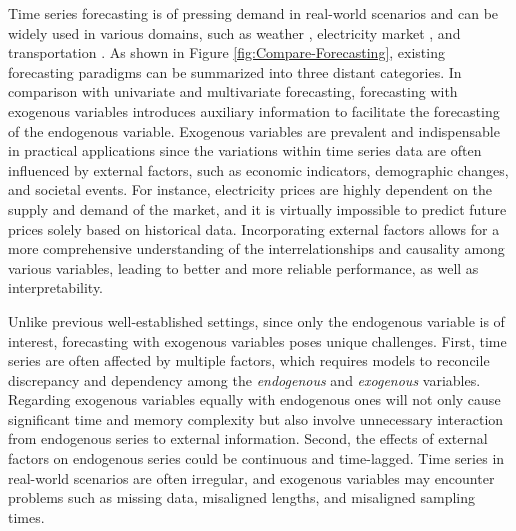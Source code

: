 \documentclass[nohyperref]{article}
\theoremstyle{plain}
\theoremstyle{definition}
\theoremstyle{remark}
\begin{document}
Time series forecasting is of pressing demand in real-world scenarios and can be widely used in various domains, such as weather \cite{wu2023interpretable, zhang2023skilful}, electricity market \cite{weron2014electricity}, and transportation \cite{lv2014traffic}. As shown in Figure \ref{fig:Compare-Forecasting}, existing forecasting paradigms can be summarized into three distant categories. In comparison with univariate and multivariate forecasting, forecasting with exogenous variables introduces auxiliary information to facilitate the forecasting of the endogenous variable. Exogenous variables are prevalent and indispensable in practical applications since the variations within time series data are often influenced by external factors, 
such as economic indicators, demographic changes, and societal events. For instance, electricity prices are highly dependent on the supply and demand of the market, and it is virtually impossible to predict future prices solely based on historical data. Incorporating external factors allows for a more comprehensive understanding of the interrelationships and causality among various variables, leading to better and more reliable performance, as well as interpretability.

Unlike previous well-established settings, since only the endogenous variable is of interest, forecasting with exogenous variables poses unique challenges. First, time series are often affected by multiple factors, which requires models to reconcile discrepancy and dependency among the \emph{endogenous} and \emph{exogenous} variables. 
Regarding exogenous variables equally with endogenous ones will not only cause significant time and memory complexity but also involve unnecessary interaction from endogenous series to external information. 
Second, the effects of external factors on endogenous series could be continuous and time-lagged.
Time series in real-world scenarios are often irregular, and exogenous variables may encounter problems such as missing data, misaligned lengths, and misaligned sampling times.
\end{document}
